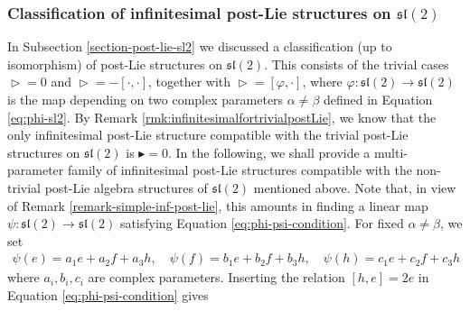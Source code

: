 \documentclass[10pt]{article}
\theoremstyle{definition}
\newcommand{\wt}{\vartriangleright}
\newcommand{\bt}{\blacktriangleright}
\newcommand{\s}{\mathfrak{s}}
\renewcommand{\l}{\mathfrak{l}}
\begin{document}
\subsubsection{Classification of infinitesimal post-Lie structures on $\s\l(2)$}
\label{subsection-inf-post-lie-sl2}
In Subsection \ref{section-post-lie-sl2} we discussed a classification (up to isomorphism) of post-Lie structures on $\s\l(2)$. This consists of the trivial cases $\wt=0$ and $\wt=-[\cdot,\cdot]$, together with $\wt=[\varphi, \cdot]$, where $\varphi: \s\l(2) \to \s\l(2)$ is the map depending on two complex parameters $\alpha\not=\beta$ defined in Equation \eqref{eq:phi-sl2}. By Remark \ref{rmk:infinitesimalfortrivialpostLie}, we know that the only infinitesimal post-Lie structure compatible with the trivial post-Lie structures on $\s\l(2)$ is $\bt=0$. In the following, we shall provide a multi-parameter family of infinitesimal post-Lie structures compatible with the non-trivial post-Lie algebra structures of $\s\l(2)$ mentioned above. Note that, in view of Remark \ref{remark-simple-inf-post-lie}, this amounts in finding a linear map $\psi: \s\l(2) \to \s\l(2)$ satisfying Equation \eqref{eq:phi-psi-condition}.
For fixed $\alpha \neq \beta$, we set 
\begin{align}
\label{eq:sl2-psi-on-generators}
\psi(e) = a_1 e + a_2 f + a_3 h,\quad
\psi(f) = b_1 e + b_2 f + b_3 h,\quad 
\psi(h) = c_1 e + c_2 f + c_3 h
\end{align}
where $a_i,b_i,c_i$ are complex parameters.
Inserting the relation $[h,e]=2e$ in Equation \eqref{eq:phi-psi-condition} gives
\begingroup
\allowdisplaybreaks
\end{document}
